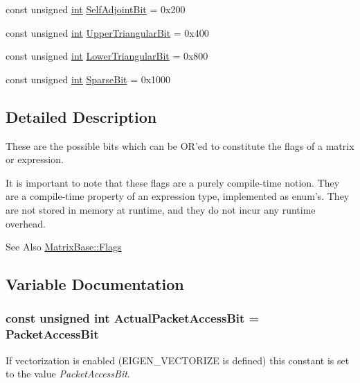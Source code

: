 \begin{DoxyCompactItemize}
\item 
const unsigned \hyperlink{ioapi_8h_a787fa3cf048117ba7123753c1e74fcd6}{int} \hyperlink{group__flags_gadb6040aad0695de4085f5dc5e641c66f}{Self\-Adjoint\-Bit} = 0x200
\item 
const unsigned \hyperlink{ioapi_8h_a787fa3cf048117ba7123753c1e74fcd6}{int} \hyperlink{group__flags_ga2c91e62bfb42e3ac7a6aae2153d2e8dc}{Upper\-Triangular\-Bit} = 0x400
\item 
const unsigned \hyperlink{ioapi_8h_a787fa3cf048117ba7123753c1e74fcd6}{int} \hyperlink{group__flags_gac61c3fd638e895edd7c3d1e89b5d170b}{Lower\-Triangular\-Bit} = 0x800
\item 
const unsigned \hyperlink{ioapi_8h_a787fa3cf048117ba7123753c1e74fcd6}{int} \hyperlink{group__flags_ga3c602d309bf5c3f5eba3d972bde5490c}{Sparse\-Bit} = 0x1000
\end{DoxyCompactItemize}


\subsection{Detailed Description}
These are the possible bits which can be O\-R'ed to constitute the flags of a matrix or expression.

It is important to note that these flags are a purely compile-\/time notion. They are a compile-\/time property of an expression type, implemented as enum's. They are not stored in memory at runtime, and they do not incur any runtime overhead.

\begin{DoxySeeAlso}{See Also}
\hyperlink{class_matrix_base_aaa53a8ec1bc1ba52b1e50631dac15d6da93aaf6d335b45cee8730ee9ebdef6f33}{Matrix\-Base\-::\-Flags} 
\end{DoxySeeAlso}


\subsection{Variable Documentation}
\hypertarget{group__flags_gaafbee24aed0aa204db61f7fce3334329}{
\subsubsection[{Actual\-Packet\-Access\-Bit}]{\setlength{\rightskip}{0pt plus 5cm}const unsigned {\bf int} Actual\-Packet\-Access\-Bit = {\bf Packet\-Access\-Bit}}}\label{group__flags_gaafbee24aed0aa204db61f7fce3334329}
If vectorization is enabled (E\-I\-G\-E\-N\-\_\-\-V\-E\-C\-T\-O\-R\-I\-Z\-E is defined) this constant is set to the value {\itshape Packet\-Access\-Bit}.

